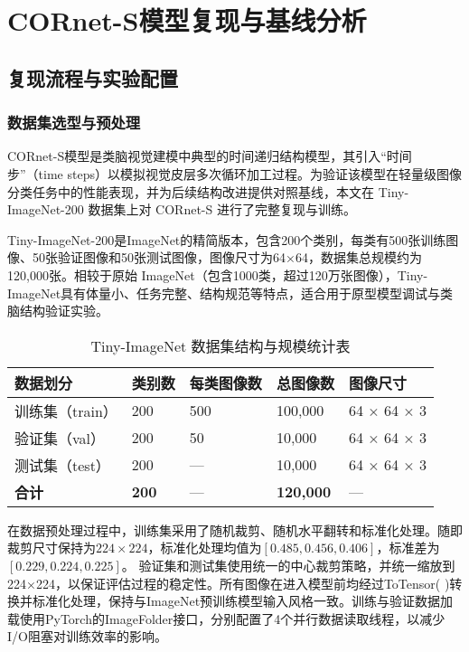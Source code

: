 \chapter{CORnet-S模型复现与基线分析}

\section{复现流程与实验配置}

\subsection{数据集选型与预处理}

CORnet-S模型是类脑视觉建模中典型的时间递归结构模型，其引入“时间步”（time steps）以模拟视觉皮层多次循环加工过程。为验证该模型在轻量级图像分类任务中的性能表现，并为后续结构改进提供对照基线，本文在 Tiny-ImageNet-200 数据集上对 CORnet-S 进行了完整复现与训练。

Tiny-ImageNet-200是ImageNet的精简版本，包含200个类别，每类有500张训练图像、50张验证图像和50张测试图像，图像尺寸为64×64，数据集总规模约为120,000张。相较于原始 ImageNet（包含1000类，超过120万张图像），Tiny-ImageNet具有体量小、任务完整、结构规范等特点，适合用于原型模型调试与类脑结构验证实验。

\begin{table}[htb]
	\centering
	\caption{Tiny-ImageNet 数据集结构与规模统计表}
	\label{tab:tinyimagenet}
	\begin{tabular}{lllll}
		\hline
		数据划分 & 类别数 & 每类图像数 & 总图像数 & 图像尺寸 \\
		\hline
		训练集（train） & 200 & 500  & 100,000  & 64 × 64 × 3 \\
		验证集（val）   & 200 & 50   & 10,000   & 64 × 64 × 3 \\
		测试集（test）  & 200 & —    & 10,000   & 64 × 64 × 3 \\
		\textbf{合计}   & \textbf{200} & — & \textbf{120,000} & — \\
		\hline
	\end{tabular}
\end{table}

在数据预处理过程中，训练集采用了随机裁剪、随机水平翻转和标准化处理。随即裁剪尺寸保持为$224×224$，标准化处理均值为$[0.485,0.456,0.406]$，标准差为$[0.229,0.224,0.225]$。
验证集和测试集使用统一的中心裁剪策略，并统一缩放到224×224，以保证评估过程的稳定性。所有图像在进入模型前均经过ToTensor( )转换并标准化处理，保持与ImageNet预训练模型输入风格一致。训练与验证数据加载使用PyTorch的ImageFolder接口，分别配置了4个并行数据读取线程，以减少I/O阻塞对训练效率的影响。

